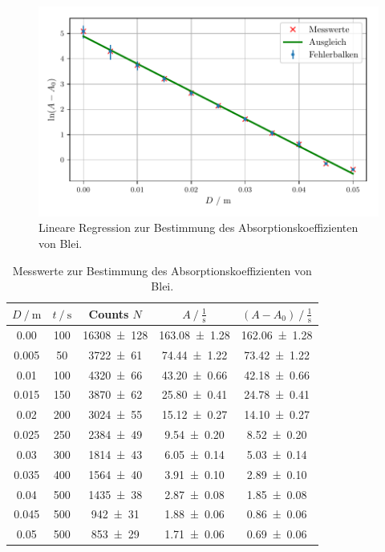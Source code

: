 \begin{figure}[H]
  \center
  \includegraphics[scale = 0.75]{blei.pdf}
  \caption{Lineare Regression zur Bestimmung des Absorptionskoeffizienten von Blei.}
  \label{fig:blei}
\end{figure}
\begin{table}[H]
  \centering
  \caption{Messwerte zur Bestimmung des Absorptionskoeffizienten von Blei.}
  \label{tab:blei}
  \begin{tabular}{c c c c c}
    \toprule
$D\:/\:\si{\meter}$ & $t\:/\:\si{\second}$ & Counts $N$ & $A\:/\:\frac{1}{\si{\second}}$ & $(A-A_0)\:/\:\frac{1}{\si{\second}}$ \\
    \midrule
    0.00  & 100 & \num{16308 +- 128} & \num{163.08 +- 1.28}   & \num{162.06 +- 1.28} \\
    0.005 & 50  & \num{3722 +- 61}   & \num{74.44 +- 1.22}    & \num{73.42 +- 1.22}  \\
    0.01  & 100 & \num{4320 +- 66}   & \num{43.20 +- 0.66}    & \num{42.18 +- 0.66}  \\
    0.015 & 150 & \num{3870 +- 62}   & \num{25.80 +- 0.41}    & \num{24.78  +- 0.41} \\
    0.02  & 200 & \num{3024 +- 55}   & \num{15.12 +- 0.27}    & \num{14.10  +- 0.27} \\
    0.025 & 250 & \num{2384 +- 49}   & \num{9.54 +- 0.20}     & \num{8.52 +- 0.20}  \\
    0.03  & 300 & \num{1814 +- 43}   & \num{6.05 +- 0.14}     & \num{5.03 +- 0.14}  \\
    0.035 & 400 & \num{1564 +- 40}   & \num{3.91 +- 0.10}     & \num{2.89 +- 0.10}  \\
    0.04  & 500 & \num{1435 +- 38}   & \num{2.87 +- 0.08}     & \num{1.85 +- 0.08}  \\
    0.045 & 500 & \num{942 +- 31}    & \num{1.88 +- 0.06}     & \num{0.86 +- 0.06}  \\
    0.05  & 500 & \num{853 +- 29}    & \num{1.71 +- 0.06}     & \num{0.69 +- 0.06}  \\
    \bottomrule
  \end{tabular}
\end{table}
